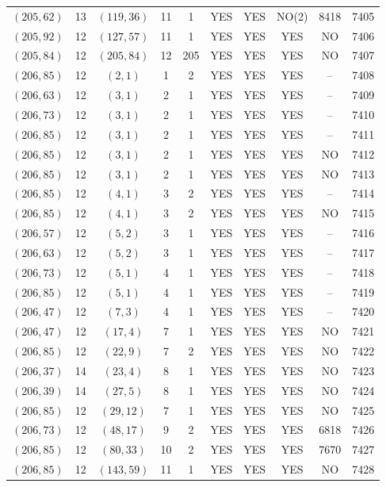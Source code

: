 \begin{longtable}{|c|c|c|c|c|c|c|c|c|c|}
$(205, 62)$ & 13 & $(119, 36)$ & 11 & 1 & YES & YES & NO(2) & 8418 & 7405\\
$(205, 92)$ & 12 & $(127, 57)$ & 11 & 1 & YES & YES & YES & NO & 7406\\
$(205, 84)$ & 12 & $(205, 84)$ & 12 & 205 & YES & YES & YES & NO & 7407\\
$(206, 85)$ & 12 & $(2, 1)$ & 1 & 2 & YES & YES & YES & -- & 7408\\
$(206, 63)$ & 12 & $(3, 1)$ & 2 & 1 & YES & YES & YES & -- & 7409\\
$(206, 73)$ & 12 & $(3, 1)$ & 2 & 1 & YES & YES & YES & -- & 7410\\
$(206, 85)$ & 12 & $(3, 1)$ & 2 & 1 & YES & YES & YES & -- & 7411\\
$(206, 85)$ & 12 & $(3, 1)$ & 2 & 1 & YES & YES & YES & NO & 7412\\
$(206, 85)$ & 12 & $(3, 1)$ & 2 & 1 & YES & YES & YES & NO & 7413\\
$(206, 85)$ & 12 & $(4, 1)$ & 3 & 2 & YES & YES & YES & -- & 7414\\
$(206, 85)$ & 12 & $(4, 1)$ & 3 & 2 & YES & YES & YES & NO & 7415\\
$(206, 57)$ & 12 & $(5, 2)$ & 3 & 1 & YES & YES & YES & -- & 7416\\
$(206, 63)$ & 12 & $(5, 2)$ & 3 & 1 & YES & YES & YES & -- & 7417\\
$(206, 73)$ & 12 & $(5, 1)$ & 4 & 1 & YES & YES & YES & -- & 7418\\
$(206, 85)$ & 12 & $(5, 1)$ & 4 & 1 & YES & YES & YES & -- & 7419\\
$(206, 47)$ & 12 & $(7, 3)$ & 4 & 1 & YES & YES & YES & -- & 7420\\
$(206, 47)$ & 12 & $(17, 4)$ & 7 & 1 & YES & YES & YES & NO & 7421\\
$(206, 85)$ & 12 & $(22, 9)$ & 7 & 2 & YES & YES & YES & NO & 7422\\
$(206, 37)$ & 14 & $(23, 4)$ & 8 & 1 & YES & YES & YES & NO & 7423\\
$(206, 39)$ & 14 & $(27, 5)$ & 8 & 1 & YES & YES & YES & NO & 7424\\
$(206, 85)$ & 12 & $(29, 12)$ & 7 & 1 & YES & YES & YES & NO & 7425\\
$(206, 73)$ & 12 & $(48, 17)$ & 9 & 2 & YES & YES & YES & 6818 & 7426\\
$(206, 85)$ & 12 & $(80, 33)$ & 10 & 2 & YES & YES & YES & 7670 & 7427\\
$(206, 85)$ & 12 & $(143, 59)$ & 11 & 1 & YES & YES & YES & NO & 7428\\

\end{longtable}
